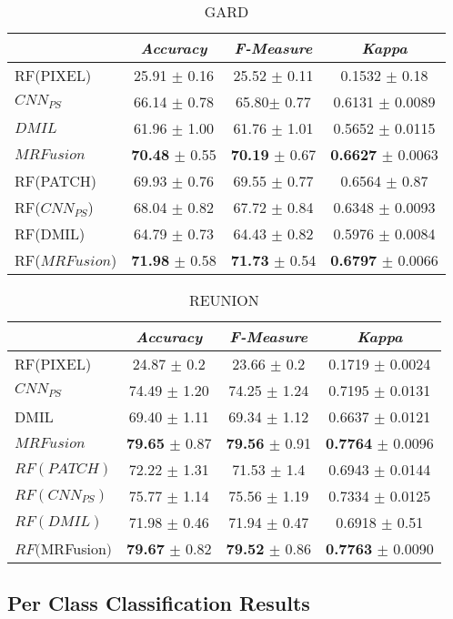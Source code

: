 \documentclass[journal]{IEEEtran}
\newcommand{\method}{$MRFusion$}
\begin{document}
\begin{table}[!ht]
\centering
\scriptsize
 \begin{tabular}{| l || c | c | c |} \hline
& \textit{ Accuracy} & \textit{ F-Measure} &\textit{ Kappa} \\ \hline \hline
  RF(PIXEL) 	& 25.91 $\pm$ 0.16 & 25.52 $\pm$ 0.11 & 0.1532 $\pm$ 0.18 \\ \hline
 $CNN_{PS}$ 	&  66.14 $\pm$ 0.78 & 65.80$\pm$ 0.77 & 0.6131 $\pm$ 0.0089	\\ \hline
 $DMIL$ &  61.96 $\pm$ 1.00 & 61.76 $\pm$	1.01 &	0.5652 $\pm$ 0.0115 \\ \hline 
  \method & \textbf{70.48} $\pm$ 0.55 & \textbf{70.19} $\pm$ 0.67 & \textbf{0.6627} $\pm$ 0.0063	\\ 
 \hline \hline
 RF(PATCH)	& 69.93 $\pm$ 0.76 &  69.55 $\pm$ 0.77 & 0.6564 $\pm$ 0.87 \\ \hline 
 RF($CNN_{PS}$) & 68.04 $\pm$ 0.82 & 67.72 $\pm$ 0.84 & 0.6348 $\pm$ 0.0093 \\ \hline
RF(DMIL) & 64.79 $\pm$ 0.73 & 64.43 $\pm$ 0.82 & 0.5976 $\pm$
0.0084 \\ \hline
RF(\method) & \textbf{71.98} $\pm$ 0.58 & \textbf{71.73} $\pm$ 0.54 &	\textbf{0.6797} $\pm$ 0.0066 \\ 
\hline
\hline
 \end{tabular}
 \caption{GARD \label{tab:GardGen}}
\end{table}\begin{table}[!ht]
\centering
\scriptsize
 \begin{tabular}{| l || c | c | c |} \hline
& \textit{ Accuracy} & \textit{ F-Measure} &\textit{ Kappa} \\ \hline \hline
 
 RF(PIXEL) 	& 24.87 $\pm$ 0.2  & 23.66 $\pm$ 0.2 & 0.1719 $\pm$ 0.0024	\\ \hline
 $CNN_{PS}$ & 74.49 $\pm$ 1.20 &  74.25 $\pm$ 1.24 & 0.7195 $\pm$ 0.0131 \\ \hline
 DMIL & 69.40 $\pm$ 1.11 & 69.34 $\pm$ 1.12	& 0.6637 $\pm$ 0.0121	\\ \hline 
  \method & \textbf{79.65} $\pm$ 0.87 & \textbf{79.56} $\pm$ 0.91 & \textbf{0.7764} $\pm$ 0.0096\\ \hline \hline
 $RF(PATCH)$	& 72.22 $\pm$ 1.31 & 71.53 $\pm$ 1.4 & 0.6943 $\pm$ 0.0144 \\ \hline 
$RF(CNN_{PS})$ & 75.77 $\pm$ 1.14 & 75.56 $\pm$ 1.19 & 0.7334 $\pm$ 0.0125\\ \hline
$RF(DMIL)$ & 71.98 $\pm$ 0.46 & 71.94 $\pm$ 0.47 & 0.6918 $\pm$ 0.51\\ \hline
$RF(\method)$ & \textbf{79.67} $\pm$ 0.82 & \textbf{79.52} $\pm$ 0.86 & \textbf{0.7763} $\pm$ 0.0090 \\ \hline

\hline
 \end{tabular}
 \caption{REUNION \label{tab:ReunionGen}}
\end{table}\subsection{Per Class Classification Results}
\end{document}

